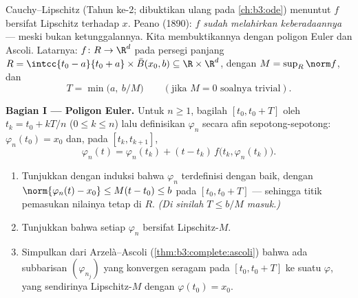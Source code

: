 \begin{problem}[{Soal akhir pekan --- keberadaan penyelesaian
$x' = f(t, x)$ tanpa Lipschitz}]\label{pb:b3:complete:1}
Cauchy--Lipschitz (Tahun ke-2; dibuktikan ulang pada \cref{ch:b3:ode})
menuntut $f$ bersifat Lipschitz terhadap $x$. Peano (1890): \emph{
$f$ sudah melahirkan keberadaannya} --- meski bukan ketunggalannya. Kita
membuktikannya dengan poligon Euler dan Ascoli. Latarnya: $f \colon R
\to \R^d$  pada persegi panjang $R = \intcc{t_0 - a}{t_0
+ a}\times \bar B(x_0, b) \subseteq \R\times\R^d$, dengan $M =
\sup_R\norm f$, dan
\[
T = \min\bigl(a,\ b/M\bigr)
\qquad (\text{jika } M = 0 \text{ soalnya trivial}).
\]

\medskip
\noindent\textbf{Bagian I --- Poligon Euler.} Untuk $n \geq 1$,
bagilah $[t_0, t_0 + T]$ oleh $t_k = t_0 + kT/n$ ($0 \leq k
\leq n$) lalu definisikan $\varphi_n$ secara afin sepotong-sepotong:
$\varphi_n(t_0) = x_0$ dan, pada $[t_k, t_{k+1}]$,
\[
\varphi_n(t) = \varphi_n(t_k) + (t -
t_k)\,f\bigl(t_k, \varphi_n(t_k)\bigr).
\]
\begin{enumerate}
  \item Tunjukkan dengan induksi bahwa $\varphi_n$ terdefinisi dengan baik,
        dengan $\norm{\varphi_n(t) - x_0} \leq M(t - t_0) \leq b$
        pada $[t_0, t_0 + T]$ --- sehingga titik pemasukan nilainya tetap
        di $R$. \emph{(Di sinilah $T \leq b/M$ masuk.)}
  \item Tunjukkan bahwa setiap $\varphi_n$ bersifat Lipschitz-$M$.
  \item Simpulkan dari Arzelà--Ascoli
        (\cref{thm:b3:complete:ascoli}) bahwa ada subbarisan
        $(\varphi_{n_j})$ yang konvergen seragam pada $[t_0, t_0 +
        T]$ ke suatu $\varphi$, yang sendirinya Lipschitz-$M$ dengan
        $\varphi(t_0) = x_0$.
\end{enumerate}


\end{problem}
